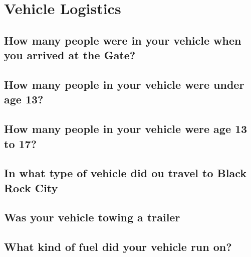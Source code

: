 \documentclass[
]{book}
\begin{document}
\hypertarget{vehicle-logistics}{%
\section{Vehicle Logistics}\label{vehicle-logistics}}

\hypertarget{how-many-people-were-in-your-vehicle-when-you-arrived-at-the-gate}{%
\subsection{How many people were in your vehicle when you arrived at the Gate?}\label{how-many-people-were-in-your-vehicle-when-you-arrived-at-the-gate}}

\hypertarget{how-many-people-in-your-vehicle-were-under-age-13}{%
\subsection{How many people in your vehicle were under age 13?}\label{how-many-people-in-your-vehicle-were-under-age-13}}

\hypertarget{how-many-people-in-your-vehicle-were-age-13-to-17}{%
\subsection{How many people in your vehicle were age 13 to 17?}\label{how-many-people-in-your-vehicle-were-age-13-to-17}}

\hypertarget{in-what-type-of-vehicle-did-ou-travel-to-black-rock-city}{%
\subsection{In what type of vehicle did ou travel to Black Rock City}\label{in-what-type-of-vehicle-did-ou-travel-to-black-rock-city}}

\hypertarget{was-your-vehicle-towing-a-trailer}{%
\subsection{Was your vehicle towing a trailer}\label{was-your-vehicle-towing-a-trailer}}

\hypertarget{what-kind-of-fuel-did-your-vehicle-run-on}{%
\subsection{What kind of fuel did your vehicle run on?}\label{what-kind-of-fuel-did-your-vehicle-run-on}}
\end{document}
